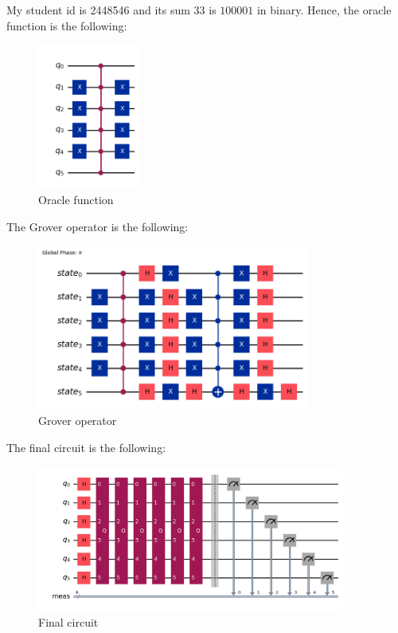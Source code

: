 \documentclass[12pt]{article}
\begin{document}
\newpage

\subsection*{}

My student id is 2448546 and its sum 33 is $ 100001 $ in binary. Hence, the oracle function is the following:

\begin{figure}[H]
    \centering
    \includegraphics[width=0.3\textwidth]{oracle.png}
    \caption{Oracle function}
\end{figure}

The Grover operator is the following:

\begin{figure}[H]
    \centering
    \includegraphics[width=0.8\textwidth]{groverOp.png}
    \caption{Grover operator}
\end{figure}

\newpage

The final circuit is the following:

\begin{figure}[H]
    \centering
    \includegraphics[width=0.9\textwidth]{groverCirc.png}
    \caption{Final circuit}
\end{figure}
\end{document}
